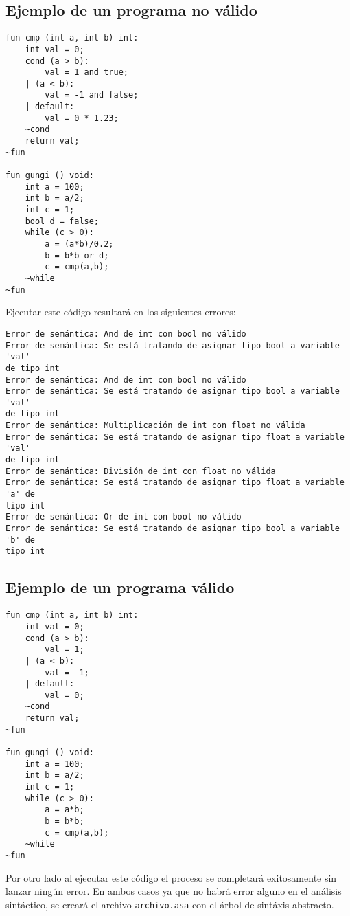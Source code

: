 \documentclass[12pt]{article}
\begin{document}
\subsection{Ejemplo de un programa no válido}
\begin{verbatim}
fun cmp (int a, int b) int:
    int val = 0;
    cond (a > b):
        val = 1 and true;
    | (a < b):
        val = -1 and false;
    | default:
        val = 0 * 1.23;
    ~cond
    return val;
~fun

fun gungi () void:
    int a = 100;
    int b = a/2;
    int c = 1;
    bool d = false;
    while (c > 0):
        a = (a*b)/0.2;
        b = b*b or d;
        c = cmp(a,b);
    ~while
~fun
\end{verbatim}

Ejecutar este código resultará en los siguientes errores:

\begin{verbatim}
Error de semántica: And de int con bool no válido
Error de semántica: Se está tratando de asignar tipo bool a variable 'val' 
de tipo int
Error de semántica: And de int con bool no válido
Error de semántica: Se está tratando de asignar tipo bool a variable 'val' 
de tipo int
Error de semántica: Multiplicación de int con float no válida
Error de semántica: Se está tratando de asignar tipo float a variable 'val' 
de tipo int
Error de semántica: División de int con float no válida
Error de semántica: Se está tratando de asignar tipo float a variable 'a' de 
tipo int
Error de semántica: Or de int con bool no válido
Error de semántica: Se está tratando de asignar tipo bool a variable 'b' de 
tipo int
\end{verbatim}

\subsection{Ejemplo de un programa válido}
\begin{verbatim}
fun cmp (int a, int b) int:
    int val = 0;
    cond (a > b):
        val = 1;
    | (a < b):
        val = -1;
    | default:
        val = 0;
    ~cond
    return val;
~fun

fun gungi () void:
    int a = 100;
    int b = a/2;
    int c = 1;
    while (c > 0):
        a = a*b;
        b = b*b;
        c = cmp(a,b);
    ~while
~fun
\end{verbatim}

Por otro lado al ejecutar este código el proceso se completará exitosamente sin lanzar ningún error. En ambos casos ya que no habrá error alguno en el análisis sintáctico, se creará el archivo \texttt{archivo.asa} con el árbol de sintáxis abstracto.
\end{document}
